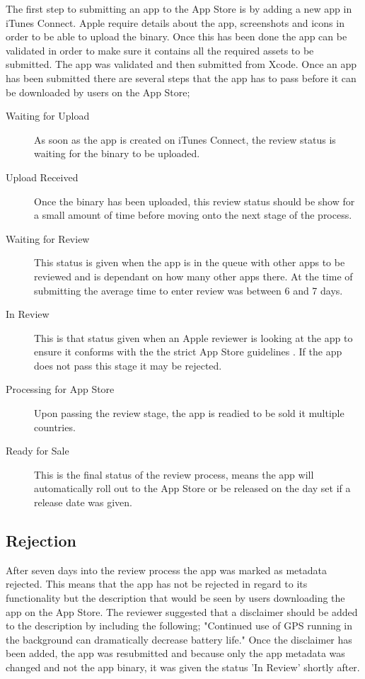 \documentclass[12pt]{report}
\begin{document}
The first step to submitting an app to the App Store is by adding a new app in iTunes Connect. Apple require details about the app, screenshots and icons in order to be able to upload the binary. Once this has been done the app can be validated in order to make sure it contains all the required assets to be submitted. The app was validated and then submitted from Xcode. Once an app has been submitted there are several steps that the app has to pass before it can be downloaded by users on the App Store; 

\begin{description}
\item[Waiting for Upload]As soon as the app is created on iTunes Connect, the review status is waiting for the binary to be uploaded.
\item[Upload Received]Once the binary has been uploaded, this review status should be show for a small amount of time before moving onto the next stage of the process.
\item[Waiting for Review]This status is given when the app is in the queue with other apps to be reviewed and is dependant on how many other apps there. At the time of submitting the average time to enter review was between 6 and 7 days. 
\item[In Review]This is that status given when an Apple reviewer is looking at the app to ensure it conforms with the the strict App Store guidelines \cite{appreview}. If the app does not pass this stage it may be rejected.
\item[Processing for App Store]Upon passing the review stage, the app is readied to be sold it multiple countries.
\item[Ready for Sale]This is the final status of the review process, means the app will automatically roll out to the App Store or be released on the day set if a release date was given.

\end{description}

\subsection{Rejection}

After seven days into the review process the app was marked as metadata rejected. This means that the app has not be rejected in regard to its functionality but the description that would be seen by users downloading the app on the App Store. The reviewer suggested that a disclaimer should be added to the description by including the following; "Continued use of GPS running in the background can dramatically decrease battery life." Once the disclaimer has been added, the app was resubmitted and because only the app metadata was changed and not the app binary, it was given the status 'In Review' shortly after.
\end{document}
